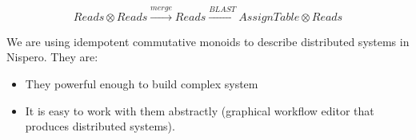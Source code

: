 \documentclass[portrait,a0paper,fontscale=0.285]{baposter} %
\newcommand{\compresslist}{ %
\setlength{\itemsep}{1pt}
\setlength{\parskip}{0pt}
\setlength{\parsep}{0pt}
}
\begin{document}
\begin{poster}
{$$ Reads \otimes Reads \xrightarrow{merge} Reads \xrightarrow{BLAST} AssignTable \otimes Reads $$



We are using idempotent commutative monoids to describe distributed	systems in Nispero. They are:

\begin{itemize}\compresslist
  \item They powerful enough to build complex system
  \item It is easy to work with them abstractly (graphical workflow editor that produces distributed systems).
\end{itemize}

}




\end{poster}
\end{document}

